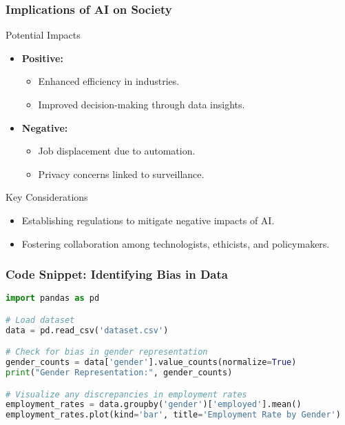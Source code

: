 \documentclass[aspectratio=169]{beamer}
\begin{document}
\begin{frame}[fragile]
    \frametitle{Implications of AI on Society}
    \begin{block}{Potential Impacts}
        \begin{itemize}
            \item \textbf{Positive:} 
            \begin{itemize}
                \item Enhanced efficiency in industries.
                \item Improved decision-making through data insights.
            \end{itemize}
            \item \textbf{Negative:} 
            \begin{itemize}
                \item Job displacement due to automation.
                \item Privacy concerns linked to surveillance.
            \end{itemize}
        \end{itemize}
    \end{block}
    \begin{block}{Key Considerations}
        \begin{itemize}
            \item Establishing regulations to mitigate negative impacts of AI.
            \item Fostering collaboration among technologists, ethicists, and policymakers.
        \end{itemize}
    \end{block}
\end{frame}

\begin{frame}[fragile]
    \frametitle{Code Snippet: Identifying Bias in Data}
    \begin{lstlisting}[language=Python]
import pandas as pd

# Load dataset
data = pd.read_csv('dataset.csv')

# Check for bias in gender representation
gender_counts = data['gender'].value_counts(normalize=True)
print("Gender Representation:", gender_counts)

# Visualize any discrepancies in employment rates
employment_rates = data.groupby('gender')['employed'].mean()
employment_rates.plot(kind='bar', title='Employment Rate by Gender')
    \end{lstlisting}
\end{frame}
\end{document}

